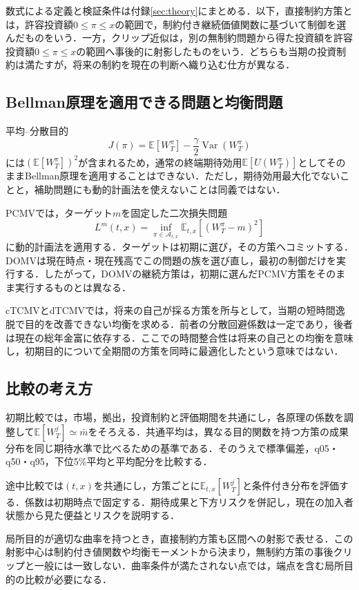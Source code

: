 \documentclass[10pt,a4paper]{article}
\theoremstyle{plain}
\theoremstyle{definition}
\newcommand{\E}{\mathbb{E}}
\DeclareMathOperator{\Var}{Var}
\begin{document}
数式による定義と検証条件は付録\ref{sec:theory}にまとめる．以下，直接制約方策とは，許容投資額$0\leq\pi\leq x$の範囲で，制約付き継続価値関数に基づいて制御を選んだものをいう．一方，クリップ近似は，別の無制約問題から得た投資額を許容投資額$0\leq\pi\leq x$の範囲へ事後的に射影したものをいう．どちらも当期の投資制約は満たすが，将来の制約を現在の判断へ織り込む仕方が異なる．

\subsection{Bellman原理を適用できる問題と均衡問題}
平均--分散目的
\[
J(\pi)=\E[W_T^{\pi}]-\frac{\gamma}{2}\Var(W_T^{\pi})
\]
には$(\E[W_T^{\pi}])^2$が含まれるため，通常の終端期待効用$\E[U(W_T^{\pi})]$としてそのままBellman原理を適用することはできない．ただし，期待効用最大化でないことと，補助問題にも動的計画法を使えないことは同義ではない．

PCMVでは，ターゲット$m$を固定した二次損失問題
\[
L^m(t,x)=\inf_{\pi\in\mathcal A_{t,x}}\E_{t,x}[(W_T^{\pi}-m)^2]
\]
に動的計画法を適用する．ターゲットは初期に選び，その方策へコミットする．DOMVは現在時点・現在残高でこの問題の族を選び直し，最初の制御だけを実行する．したがって，DOMVの継続方策は，初期に選んだPCMV方策をそのまま実行するものとは異なる．

cTCMVとdTCMVでは，将来の自己が採る方策を所与として，当期の短時間逸脱で目的を改善できない均衡を求める．前者の分散回避係数は一定であり，後者は現在の総年金富に依存する．ここでの時間整合性は将来の自己との均衡を意味し，初期目的について全期間の方策を同時に最適化したという意味ではない．

\subsection{比較の考え方}
初期比較では，市場，拠出，投資制約と評価期間を共通にし，各原理の係数を調整して$\E[W_T^j]\simeq\bar m$をそろえる．共通平均は，異なる目的関数を持つ方策の成果分布を同じ期待水準で比べるための基準である．そのうえで標準偏差，q05・q50・q95，下位5\%平均と平均配分を比較する．

途中比較では$(t,x)$を共通にし，方策ごとに$\E_{t,x}[W_T^j]$と条件付き分布を評価する．係数は初期時点で固定する．期待成果と下方リスクを併記し，現在の加入者状態から見た便益とリスクを説明する．

局所目的が適切な曲率を持つとき，直接制約方策も区間への射影で表せる．この射影中心は制約付き値関数や均衡モーメントから決まり，無制約方策の事後クリップと一般には一致しない．曲率条件が満たされない点では，端点を含む局所目的の比較が必要になる．
\end{document}
